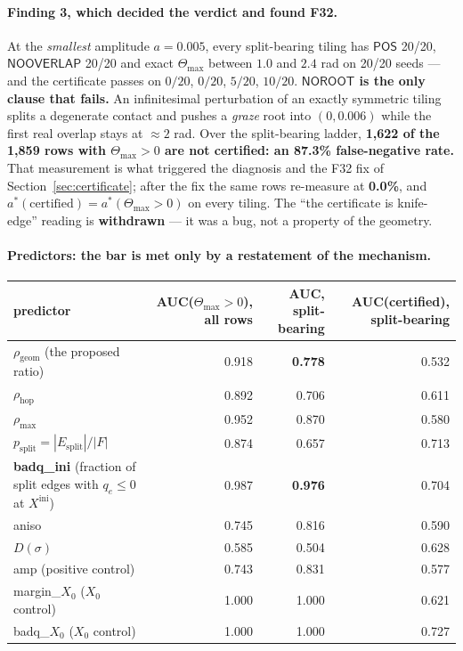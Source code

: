 \documentclass[11pt,a4paper]{article}
\theoremstyle{definition}
\newcommand{\Tmax}{\Theta_{\max}}
\newcommand{\Esplit}{E_{\mathrm{split}}}
\newcommand{\POS}{\textsf{POS}}
\newcommand{\NOOV}{\textsf{NOOVERLAP}}
\newcommand{\NOROOT}{\textsf{NOROOT}}
\begin{document}
\paragraph{Finding 3, which decided the verdict and found F32.} At the \emph{smallest}
amplitude $a=0.005$, every split-bearing tiling has $\POS$ 20/20, $\NOOV$ 20/20 and exact
$\Tmax$ between $1.0$ and $2.4$ rad on 20/20 seeds --- and the certificate passes on
$0/20$, $0/20$, $5/20$, $10/20$. \textbf{$\NOROOT$ is the only clause that fails.} An
infinitesimal perturbation of an exactly symmetric tiling splits a degenerate contact and
pushes a \emph{graze} root into $(0,0.006)$ while the first real overlap stays at $\approx2$
rad. Over the split-bearing ladder, \textbf{1{,}622 of the 1{,}859 rows with $\Tmax>0$ are not
certified: an 87.3\% false-negative rate.} That measurement is what triggered the diagnosis
and the F32 fix of Section~\ref{sec:certificate}; after the fix the same rows re-measure at
\textbf{0.0\%}, and $a^*(\text{certified}) = a^*(\Tmax>0)$ on every tiling. The ``the
certificate is knife-edge'' reading is \textbf{withdrawn} --- it was a bug, not a property of
the geometry.

\paragraph{Predictors: the bar is met only by a restatement of the mechanism.}

\begin{center}
\footnotesize
\begin{tabular}{@{}lrrr@{}}
\toprule
predictor & AUC($\Tmax>0$), all rows & AUC, split-bearing & AUC(certified), split-bearing \\
\midrule
$\rho_{\mathrm{geom}}$ (the proposed ratio) & 0.918 & \textbf{0.778} & 0.532 \\
$\rho_{\mathrm{hop}}$ & 0.892 & 0.706 & 0.611 \\
$\rho_{\max}$ & 0.952 & 0.870 & 0.580 \\
$p_{\mathrm{split}}=|\Esplit|/|F|$ & 0.874 & 0.657 & 0.713 \\
\textbf{badq\_ini} (fraction of split edges with $q_e\le0$ at $X^{\mathrm{ini}}$) & 0.987 & \textbf{0.976} & 0.704 \\
aniso & 0.745 & 0.816 & 0.590 \\
$D(\sigma)$ & 0.585 & 0.504 & 0.628 \\
amp (positive control) & 0.743 & 0.831 & 0.577 \\
margin\_$X_0$ ($X_0$ control) & 1.000 & 1.000 & 0.621 \\
badq\_$X_0$ ($X_0$ control) & 1.000 & 1.000 & 0.727 \\
\bottomrule
\end{tabular}
\end{center}
\end{document}

